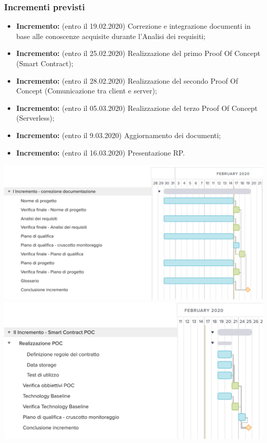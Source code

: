 \subsubsection{Incrementi previsti}
\begin{itemize}
	\item \textbf{ Incremento:} (entro il 19.02.2020) Correzione e integrazione documenti in base alle conoscenze acquisite durante l'Analisi dei requisiti;
	\item \textbf{ Incremento:} (entro il 25.02.2020) Realizzazione del primo Proof Of Concept (Smart Contract);
	\item \textbf{ Incremento:} (entro il 28.02.2020) Realizzazione del secondo Proof Of Concept (Comunicazione tra client e server);
	\item \textbf{ Incremento:} (entro il 05.03.2020) Realizzazione del terzo Proof Of Concept (Serverless);
	\item \textbf{ Incremento:} (entro il 9.03.2020) Aggiornamento dei documenti;
	\item \textbf{ Incremento:} (entro il 16.03.2020) Presentazione RP.
\end{itemize}
	\includegraphics[width=\textwidth]{res/img/gantt/RP/1}
	\includegraphics[width=\textwidth]{res/img/gantt/RP/2}
